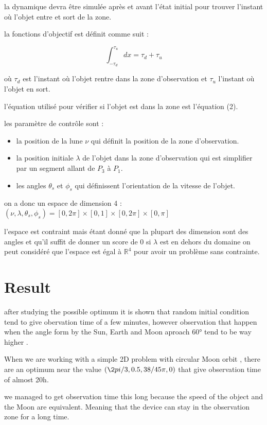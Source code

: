 \documentclass{article} %
\begin{document}
		la dynamique devra être simulée après et avant l'état initial pour trouver l'instant où l'objet entre et sort de la zone.
		
		la fonctions d'objectif est définit comme suit :
		
		$$
		\int_{-\tau_d}^{\tau_u}dx=\tau_d+\tau_u
		$$
		
		où $\tau_d$ est l'instant où l'objet rentre dans la zone d'observation et $\tau_u$ l'instant où l'objet en sort.
		
		l'équation utilisé pour vérifier si l'objet est dans la zone est l'équation (2).
		
		les paramètre de contrôle sont :
		
		\begin{itemize}
			\item la position de la lune $\nu$ qui définit la position de la zone d'observation.
			\item la position initiale $\lambda$ de l'objet dans la zone d'observation qui est simplifier par un segment allant de $P_3$ à $P_1$. 
			\item les angles $\theta_s$ et $\phi_s$ qui définissent l'orientation de la vitesse de l'objet.
		\end{itemize}
		
		on a donc un espace de dimension 4 :
		$(\nu,\lambda,\theta_s,\phi_s)=[0,2\pi]\times[0,1]\times[0,2\pi]\times[0,\pi]$
		
		l'espace est contraint mais étant donné que la plupart des dimension sont des angles et qu'il suffit de donner un score de 0 si $\lambda$ est en dehors du domaine on peut considéré que l'espace est égal à $\mathbb{R}^4$ pour avoir un problème sans contrainte.
		
		\section{Result}
		
		after studying the possible optimum it is shown that random initial condition tend to give obervation time of a few minutes, however observation that happen when the angle form by the Sun, Earth and Moon aproach 60° tend to be way higher .
		
		When we are working with a simple 2D problem with circular Moon orbit , there are an optimum near the value $(\2pi/3,0.5,38/45\pi,0)$ that give observation time of almost 20h.
		
		we managed to get observation time this long because the speed of the object and the Moon are equivalent. Meaning that the device can stay in the observation zone for a long time.
		
\end{document}
